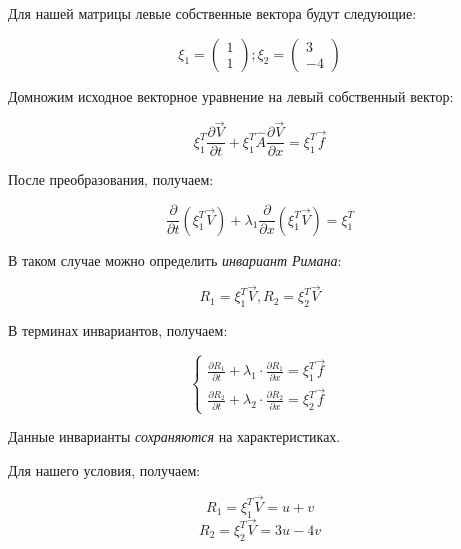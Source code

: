 \documentclass[10pt,a4paper]{article}
\begin{document}
	Для нашей матрицы левые собственные вектора будут следующие:
	
	\begin{equation}
		\xi_{1} = \begin{pmatrix}
			1 \\ 1
		\end{pmatrix}; 
		\xi_{2} = \begin{pmatrix}
			3 \\ -4
		\end{pmatrix}
	\end{equation}
	
	Домножим исходное векторное уравнение на левый собственный вектор:
	
	\begin{equation}
		\xi_{1}^{T}\frac{\partial \vec{V}}{\partial t} + \xi_{1}^{T}\hat{A}
		\frac{\partial \vec{V}}{\partial x} = \xi_{1}^{T}\vec{f}
	\end{equation}
	
	После преобразования, получаем:
	
	\begin{equation}
		\frac{\partial}{\partial t}\left(\xi_{1}^{T}\vec{V}\right) + 
		\lambda_{1}\frac{\partial}{\partial x}\left(\xi_{1}^{T}\vec{V}\right) =
		\xi_{1}^{T}
	\end{equation}
	
	В таком случае можно определить \textit{инвариант Римана}:
	
	\begin{equation}
		R_{1} = \xi_{1}^{T}\vec{V}, R_{2} = \xi_{2}^{T}\vec{V}
	\end{equation}
	
	В терминах инвариантов, получаем:
	
	\begin{equation}
		\begin{cases}
			\frac{\partial R_{1}}{\partial t} + \lambda_{1}\cdot
			\frac{\partial R_{1}}{\partial x} = \xi_{1}^{T}\vec{f}
			\\
			\frac{\partial R_{2}}{\partial t} + \lambda_{2}\cdot
			\frac{\partial R_{2}}{\partial x} = \xi_{2}^{T}\vec{f}
		\end{cases}
	\end{equation}
	
	Данные инварианты \textit{сохраняются } на характеристиках.
	
	Для нашего условия, получаем:
	
	\begin{equation}
		R_{1} = \xi_{1}^{T}\vec{V} = u + v
	\end{equation}
	\begin{equation}
		R_{2} = \xi_{2}^{T}\vec{V} = 3u - 4v
	\end{equation}
	
\end{document}
